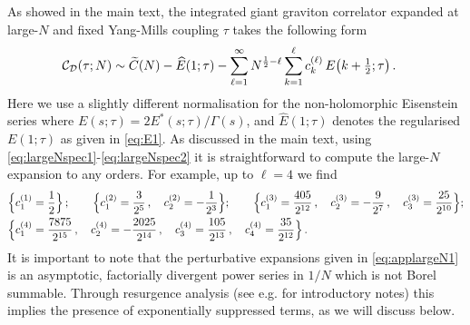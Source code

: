 \documentclass[aps,prl,twocolumn, longbibliography,footinbib,superscriptaddress, preprintnumbers]{revtex4-1}
\newcommand{\<}{\langle}
\renewcommand{\>}{\rangle}
\begin{document}
{As showed in the main text, the integrated giant graviton correlator expanded at large-$N$ and fixed Yang-Mills coupling $\tau$ takes the following form
\begin{align} \label{eq:applargeN1}
    \mathcal{C}_\mathcal{D}(\tau; N)& \sim \widetilde{C}(N) -\widehat{E}(1; \tau) - \sum_{\ell=1}^{\infty} N^{{1 \over 2}-\ell}  \sum_{k=1}^{\ell} c^{(\ell)}_{k}\, E\big(k+ \tfrac{1}{2}; \tau \big)\, .
    \end{align}
Here we use a slightly different normalisation for the non-holomorphic Eisenstein series where $ E(s;\tau) = 2E^*(s;\tau)/\Gamma(s)$, and $\widehat{E}(1; \tau)$ denotes the regularised ${E}(1; \tau)$ as given in \eqref{eq:E1}. As discussed in the main text, using \eqref{eq:largeNspec1}-\eqref{eq:largeNspec2} it is straightforward to compute the large-$N$ expansion to any orders. For example, up to $\ell=4$ we find
\begin{align} \label{eq:clk}
    \Big\{  c^{(1)}_{1} &= {1 \over 2} \Big\} \, ; \qquad   \Big\{c^{(2)}_{1} = {3 \over 2^5} \, , \quad  c^{(2)}_{2} = - {1 \over 2^3}  \Big\} ; \qquad  \Big\{ c^{(3)}_{1} = {405 \over 2^{12}} \, , \quad  c^{(3)}_{2} = - {9 \over 2^7}\, , \quad  c^{(3)}_{3} =  {25 \over 2^{10}} \Big\} ; \\
  \Big\{c^{(4)}_{1} &= {7875 \over 2^{15}} \, , \quad   c^{(4)}_{2} = - {2025 \over 2^{14}}\, , \quad  c^{(4)}_{3} =  {105 \over 2^{13}} \, , \quad  c^{(4)}_{4} =  {35 \over 2^{12}} \Big\}\, . \nonumber
\end{align}
It is important to note that the perturbative expansions given in \eqref{eq:applargeN1} is an asymptotic, factorially divergent power series in $1/N$ which is not Borel summable. Through resurgence analysis (see e.g. \cite{Dorigoni:2014hea} for introductory notes) this implies the presence of exponentially suppressed terms, as we will discuss below.

}
\end{document}
